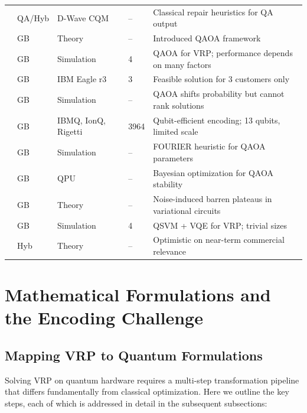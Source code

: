 \documentclass[preprint,3p,12pt,authoryear]{elsarticle}
\begin{document}
\begin{table}[h!]
\begin{tabular}{p{3.2cm}p{1.2cm}p{2.0cm}p{1.0cm}p{4.5cm}}
\citet{holliday2025advanced} & QA/Hyb & D-Wave CQM & -- & Classical repair heuristics for QA output \\
\citet{farhi2014quantum} & GB & Theory & -- & Introduced QAOA framework \\
\citet{azad2022solving} & GB & Simulation & 4 & QAOA for VRP; performance depends on many factors \\
\citet{azfar2025quantum} & GB & IBM Eagle r3 & 3 & Feasible solution for 3 customers only \\
\citet{fitzek2024applying} & GB & Simulation & -- & QAOA shifts probability but cannot rank solutions \\
\citet{leonidas2023qubit} & GB & IBMQ, IonQ, Rigetti & 3964 & Qubit-efficient encoding; 13 qubits, limited scale \\
\citet{zhou2020quantum} & GB & Simulation & -- & FOURIER heuristic for QAOA parameters \\
\citet{cheng2024quantum} & GB & QPU & -- & Bayesian optimization for QAOA stability \\
\citet{wang2021noise} & GB & Theory & -- & Noise-induced barren plateaus in variational circuits \\
\citet{mohanty2024solving} & GB & Simulation & 4 & QSVM + VQE for VRP; trivial sizes \\
\citet{sciorilli2025towards} & Hyb & Theory & -- & Optimistic on near-term commercial relevance \\
\bottomrule
\end{tabular}
\end{table}

\FloatBarrier

\section{Mathematical Formulations and the Encoding Challenge}\label{sec:formulations}

\subsection{Mapping VRP to Quantum Formulations}

Solving VRP on quantum hardware requires a multi-step transformation pipeline that differs fundamentally from classical optimization. Here we outline the key steps, each of which is addressed in detail in the subsequent subsections:
\end{document}
